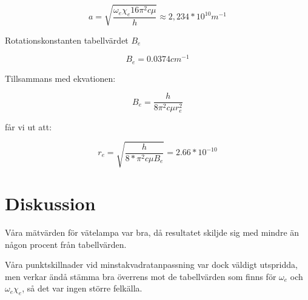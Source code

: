 \documentclass[a4paper,10pt]{article}
\begin{document}
$$ a = \sqrt{\frac{\omega_e\chi_e16\pi^2c\mu}{h}} \approx 2,234*10^{10} m^{-1} $$

Rotationskonstanten tabellvärdet $B_e$

$$ B_e = 0.0374 cm^{-1} $$

Tillsammans med ekvationen: 

$$ B_e = \frac{h}{8\pi^2c\mu r_e^2} $$

får vi ut att:

$$ r_e = \sqrt{\frac{h}{8*\pi^2c\mu B_e}} = 2.66*10^{-10} $$

\section{Diskussion}

Våra mätvärden för vätelampa var bra, då resultatet skiljde sig med mindre än någon procent från tabellvärden.

Våra punktskillnader vid minstakvadratanpassning var dock väldigt utspridda, men verkar ändå stämma bra överrens mot de tabellvärden som finns för $\omega_e$ och $\omega_e\chi_e$, så det var ingen större felkälla.
\end{document}
